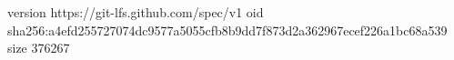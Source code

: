 version https://git-lfs.github.com/spec/v1
oid sha256:a4efd255727074dc9577a5055cfb8b9dd7f873d2a362967ecef226a1bc68a539
size 376267
